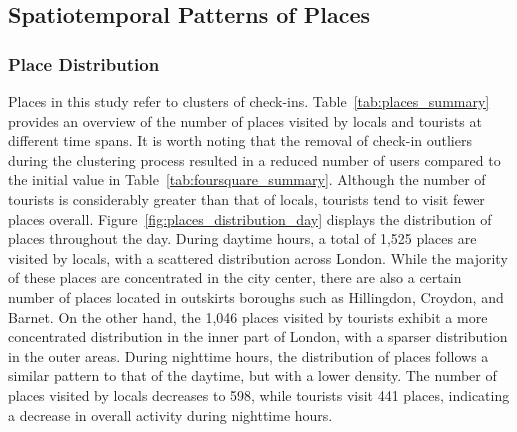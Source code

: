 \documentclass{article}
\theoremstyle{definition}
\theoremstyle{remark}
\begin{document}
\subsection{Spatiotemporal Patterns of Places} \label{patterns_places}

\subsubsection{Place Distribution}
Places in this study refer to clusters of check-ins. Table~\ref{tab:places_summary} provides an overview of the number of places visited by locals and tourists at different time spans. It is worth noting that the removal of check-in outliers during the clustering process resulted in a reduced number of users compared to the initial value in Table~\ref{tab:foursquare_summary}. Although the number of tourists is considerably greater than that of locals, tourists tend to visit fewer places overall. Figure~\ref{fig:places_distribution_day} displays the distribution of places throughout the day. During daytime hours, a total of 1,525 places are visited by locals, with a scattered distribution across London. While the majority of these places are concentrated in the city center, there are also a certain number of places located in outskirts boroughs such as Hillingdon, Croydon, and Barnet. On the other hand, the 1,046 places visited by tourists exhibit a more concentrated distribution in the inner part of London, with a sparser distribution in the outer areas. During nighttime hours, the distribution of places follows a similar pattern to that of the daytime, but with a lower density. The number of places visited by locals decreases to 598, while tourists visit 441 places, indicating a decrease in overall activity during nighttime hours.
\end{document}
